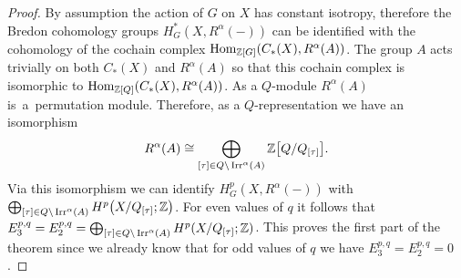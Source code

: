 \documentclass[pdftex]{sigma}
\def\Z{\mathbb{Z}}
\DeclareMathOperator{\Hom}{\textup{Hom}}
\DeclareMathOperator{\Irr}{\textup{Irr}}
\theoremstyle{definition}
\numberwithin{equation}{section}
\begin{document}
\begin{proof}
By assumption the action of $G$ on $X$ has constant isotropy, therefore the Bredon coho\-mo\-logy groups
$H^*_G(X, R^{\alpha}(-))$ can be identified with the cohomology
of the cochain comp\-lex $\Hom_{\Z[G]}(C_{*}(X),R^{\alpha}(A))$. The group $A$ acts trivially on both
$C_{*}(X)$ and $R^{\alpha}(A)$ so that this cochain comp\-lex is isomorphic to
$\Hom_{\Z[Q]}(C_{*}(X),R^{\alpha}(A))$. As a $Q$-module $R^{\alpha}(A)$ is~a~per\-mutation module.
Therefore, as a $Q$-representation we have
an isomorphism
\begin{gather*}
R^{\alpha}(A)\cong \bigoplus_{[\tau]\in Q \backslash\Irr^{\alpha}(A)} \Z\big[Q/Q_{[\tau]}\big].
\end{gather*}
Via this isomorphism we can identify $H_G^p(X,R^{\alpha}(-))$ with
$\bigoplus_{[\tau]\in Q \backslash\Irr^{\alpha}(A)}H^{p}\big(X/Q_{[\tau]};\Z\big)$. For even values of $q$
it follows that $E_{3}^{p,q}=E_{2}^{p,q}=\bigoplus_{[\tau]\in Q \backslash \Irr^{\alpha}(A)}H^{p}(X/Q_{[\tau]};\Z)$.
This proves the first part of the theorem since we already know that for odd values of $q$ we have
$E_{3}^{p,q}=E_{2}^{p,q}=0$.


\end{proof}
\end{document}
